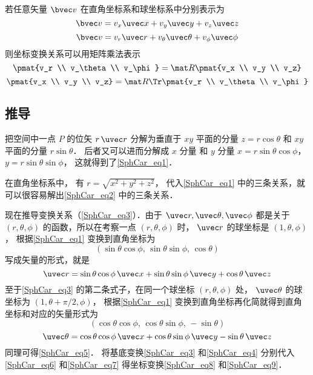 若任意矢量 $\bvec v$ 在直角坐标系和球坐标系中分别表示为
\begin{equation}\label{SphCar_eq7}
\bvec v = v_x \uvec x + v_y \uvec y + v_z \uvec z
\end{equation}
\begin{equation}\label{SphCar_eq6}
\bvec v = v_r \uvec r + v_\theta \uvec \theta + v_\phi \uvec \phi
\end{equation}
则坐标变换关系可以用矩阵乘法表示
\begin{equation}\label{SphCar_eq9}
\pmat{v_r \\ v_\theta \\ v_\phi}
= \mat R \pmat{v_x \\ v_y \\ v_z}
\end{equation}
\begin{equation}\label{SphCar_eq8}
\pmat{v_x \\ v_y \\ v_z}
= \mat R\Tr \pmat{v_r \\ v_\theta \\ v_\phi}
\end{equation}

\subsection{推导}
把空间中一点 $P$ 的位矢 $r \,\uvec r$ 分解为垂直于 $xy$ 平面的分量 $z = r\cos \theta $ 和 $xy$ 平面的分量 $r\sin \theta $． 后者又可以进而分解成 $x$ 分量 和 $y$ 分量  $x = r\sin \theta \cos \phi$，  $y = r\sin \theta \sin \phi$， 这就得到了\autoref{SphCar_eq1}．

在直角坐标系中， 有 $r = \sqrt {x^2 + y^2 + z^2}$， 代入\autoref{SphCar_eq1} 中的三条关系，就可以很容易解出\autoref{SphCar_eq2} 中的三条关系．

现在推导变换关系（\autoref{SphCar_eq3}）．由于 $\uvec r,\uvec \theta ,\uvec \phi $ 都是关于 $(r, \theta, \phi)$ 的函数，所以在考察一点 $(r, \theta, \phi)$ 时， $\uvec r$ 的球坐标是 $(1, \theta, \phi)$，  根据\autoref{SphCar_eq1} 变换到直角坐标为
\begin{equation}
(\sin \theta \cos \phi,\,\sin \theta \sin \phi,\,\cos \theta)
\end{equation}
写成矢量的形式，就是
 \begin{equation}
\uvec r = \sin \theta \cos \phi \,\uvec x + \sin \theta \sin \phi \,\uvec y + \cos \theta \,\uvec z
\end{equation}
至于\autoref{SphCar_eq3} 的第二条式子，在同一个球坐标 $(r,\theta ,\phi)$ 处， $\uvec \theta $ 的球坐标为 $(1, \theta + \pi /2, \phi)$， 根据\autoref{SphCar_eq1} 变换到直角坐标再化简就得到直角坐标和对应的矢量形式为
\begin{equation}
(\cos \theta \cos \phi ,\,\cos \theta \sin \phi , \,- \sin \theta)
\end{equation}
\begin{equation}
\uvec \theta  = \cos \theta \cos \phi \,\uvec x + \cos \theta \sin \phi \,\uvec y - \sin \theta \,\uvec z
\end{equation}
同理可得\autoref{SphCar_eq5}． 将基底变换\autoref{SphCar_eq3} 和\autoref{SphCar_eq4} 分别代入\autoref{SphCar_eq6} 和\autoref{SphCar_eq7} 得坐标变换\autoref{SphCar_eq8} 和\autoref{SphCar_eq9}．

